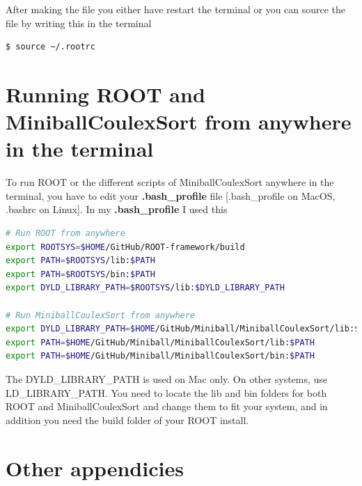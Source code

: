 \documentclass[twoside,english]{uiofysmaster/uiofysmaster}
\begin{document}
\begin{appendices}
After making the file you either have restart the terminal or you can source the file by writing this in the terminal
\begin{lstlisting}[language=sh]
$ source ~/.rootrc
\end{lstlisting}


\chapter{Running ROOT and MiniballCoulexSort from anywhere in the terminal}
To run ROOT or the different scripts of MiniballCoulexSort anywhere in the terminal, you have to edit your \textbf{.bash\_profile} file [.bash\_profile on MacOS, .bashrc on Linux]. In my \textbf{.bash\_profile} I used this 
\begin{lstlisting}[language=sh]
# Run ROOT from anywhere
export ROOTSYS=$HOME/GitHub/ROOT-framework/build
export PATH=$ROOTSYS/lib:$PATH
export PATH=$ROOTSYS/bin:$PATH
export DYLD_LIBRARY_PATH=$ROOTSYS/lib:$DYLD_LIBRARY_PATH

# Run MiniballCoulexSort from anywhere
export DYLD_LIBRARY_PATH=$HOME/GitHub/Miniball/MiniballCoulexSort/lib:$DYLD_LIBRARY_PATH
export PATH=$HOME/GitHub/Miniball/MiniballCoulexSort/lib:$PATH
export PATH=$HOME/GitHub/Miniball/MiniballCoulexSort/bin:$PATH
\end{lstlisting}
The DYLD\_LIBRARY\_PATH is used on Mac only. On other systems, use \newline LD\_LIBRARY\_PATH. You need to locate the lib and bin folders for both ROOT and MiniballCoulexSort and change them to fit your system, and in addition you need the build folder of your ROOT install.


\chapter{Other appendicies}



\end{appendices}



%


\end{document}
